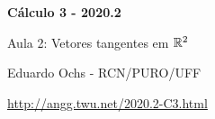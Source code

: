 \documentclass[oneside,12pt]{article}
\begin{document}


\long{}
\long{}
\long{}
\long{}
\long{}
\long{}
\long{}
\long{}
\long{}
\long{}

\long{}
\long{}

\def\frown{\ensuremath{{=}{(}}}
\def\True {\mathbf{V}}
\def\False{\mathbf{F}}

\def\drafturl{http://angg.twu.net/LATEX/2020-2-C3.pdf}
\def\drafturl{http://angg.twu.net/2020.2-C3.html}
\def\draftfooter{\tiny \href{\drafturl}{\jobname{}} \ColorBrown{\shorttoday{} \hours}}



%

\thispagestyle{empty}

\begin{center}

\vspace*{1.2cm}

{\bf \Large Cálculo 3 - 2020.2}

\bsk

Aula 2: Vetores tangentes em $\mathbb{R}^2$

\bsk

Eduardo Ochs - RCN/PURO/UFF

\url{http://angg.twu.net/2020.2-C3.html}

\end{center}

\newpage
\end{document}
